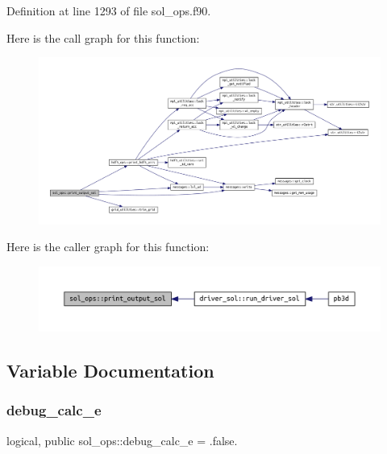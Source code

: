 Definition at line 1293 of file sol\+\_\+ops.\+f90.

Here is the call graph for this function\+:
\nopagebreak
\begin{figure}[H]
\begin{center}
\leavevmode
\includegraphics[width=350pt]{namespacesol__ops_abd5b3b2d7008f482dd38f898a3300357_cgraph}
\end{center}
\end{figure}
Here is the caller graph for this function\+:
\nopagebreak
\begin{figure}[H]
\begin{center}
\leavevmode
\includegraphics[width=350pt]{namespacesol__ops_abd5b3b2d7008f482dd38f898a3300357_icgraph}
\end{center}
\end{figure}


\subsection{Variable Documentation}
\mbox{\label{namespacesol__ops_a4dc364bc6b70b805abdc3ed0ab2e5226}} 
\subsubsection{\texorpdfstring{debug\+\_\+calc\+\_\+e}{debug\_calc\_e}}
{\footnotesize\ttfamily logical, public sol\+\_\+ops\+::debug\+\_\+calc\+\_\+e = .false.}



